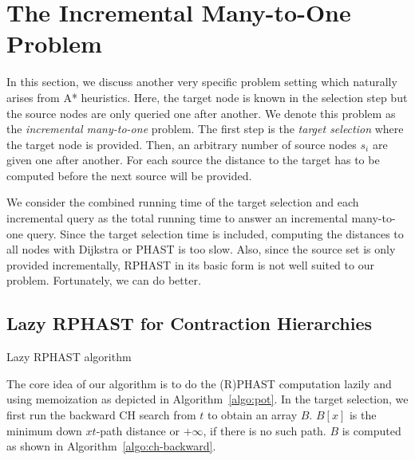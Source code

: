 \documentclass[manuscript,review]{acmart}
\begin{document}
\section{The Incremental Many-to-One Problem}\label{sec:lazy-rphast}

In this section, we discuss another very specific problem setting which naturally arises from A* heuristics.
Here, the target node is known in the selection step but the source nodes are only queried one after another.
We denote this problem as the \emph{incremental many-to-one} problem.
The first step is the \emph{target selection} where the target node is provided.
Then, an arbitrary number of source nodes $s_i$ are given one after another.
For each source the distance to the target has to be computed before the next source will be provided.

We consider the combined running time of the target selection and each incremental query as the total running time to answer an incremental many-to-one query.
Since the target selection time is included, computing the distances to all nodes with Dijkstra or PHAST is too slow.
Also, since the source set is only provided incrementally, RPHAST in its basic form is not well suited to our problem.
Fortunately, we can do better.

\subsection{Lazy RPHAST for Contraction Hierarchies}

\begin{algorithm2e}
\caption{Lazy RPHAST algorithm}
\label{algo:pot}
\end{algorithm2e}

The core idea of our algorithm is to do the (R)PHAST computation lazily and using memoization as depicted in Algorithm~\ref{algo:pot}.
In the target selection, we first run the backward CH search from $t$ to obtain an array $B$.
$B[x]$ is the minimum down $xt$-path distance or $+\infty$, if there is no such path.
$B$ is computed as shown in Algorithm~\ref{algo:ch-backward}.
\end{document}

